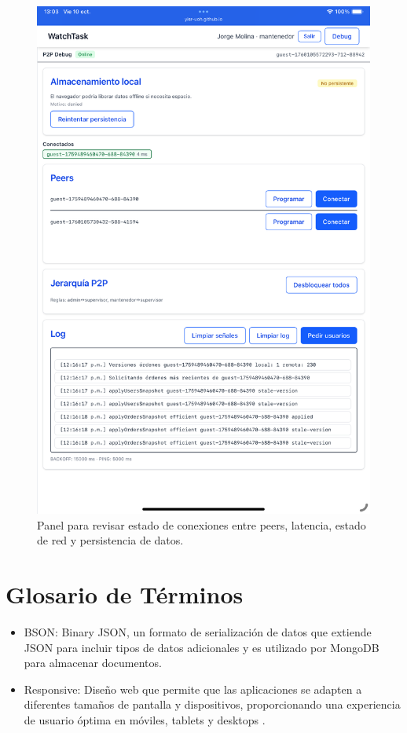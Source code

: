 \documentclass[12pt,a4paper]{report}
\begin{document}
\begin{figure}[h]
    \centering
    \includegraphics[width=1\textwidth]{data/Debug_Panel.png}
    \caption[\,Panel de depuración P2P]{Panel para revisar estado de conexiones entre peers, latencia, estado de red y persistencia de datos.}
    \label{fig:[Debug_Panel]}
\end{figure}



\chapter*{Glosario de Términos}
\begin{itemize}
    \item BSON: Binary JSON, un formato de serialización de datos que extiende JSON para incluir tipos de datos adicionales y es utilizado por MongoDB para almacenar documentos.
    \item Responsive: Diseño web que permite que las aplicaciones se adapten a diferentes tamaños de pantalla y dispositivos, proporcionando una experiencia de usuario óptima en móviles, tablets y desktops .
\end{itemize}




\end{document}
